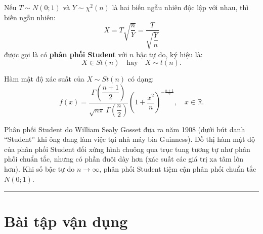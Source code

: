 \begin{dinhnghia}
Nếu $T \sim N(0; 1)$ và $Y \sim \chi^2(n)$ là hai biến ngẫu nhiên độc lập với nhau, thì biến ngẫu nhiên:
\[
X = T \sqrt{\frac{n}{Y}} = \frac{T}{\sqrt{\dfrac{Y}{n}}}
\]
được gọi là có \textbf{phân phối Student} với $n$ bậc tự do, ký hiệu là:
\[
X \in St(n) \quad \text{hay} \quad X \sim t(n).
\]

Hàm mật độ xác suất của $X \sim St(n)$ có dạng:
\[
f(x) = \frac{\Gamma\left(\dfrac{n + 1}{2}\right)}{\sqrt{n\pi} \, \Gamma\left(\dfrac{n}{2}\right)} \left(1 + \frac{x^2}{n}\right)^{-\frac{n + 1}{2}}, \quad x \in \mathbb{R}.
\]
\end{dinhnghia}

\begin{nhanxet}
Phân phối Student do William Sealy Gosset đưa ra năm 1908 (dưới bút danh ``Student'' khi ông đang làm việc tại nhà máy bia Guinness). Đồ thị hàm mật độ của phân phối Student đối xứng hình chuông qua trục tung tương tự như phân phối chuẩn tắc, nhưng có phần đuôi dày hơn (xác suất các giá trị xa tâm lớn hơn). Khi số bậc tự do $n \to \infty$, phân phối Student tiệm cận phân phối chuẩn tắc $N(0; 1)$.
\end{nhanxet}

\vspace{1.5em}
\hrule
\vspace{1.5em}

\section{Bài tập vận dụng}

